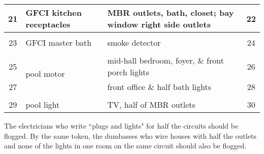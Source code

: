 \documentclass[10pt]{article}
\newcommand{\sep}{1mm}
\newcommand{\negsep}{-4mm}
\newcommand{\+}{\item}		%
\begin{document}
{\begin{minipage}[c]{3.36in}
\begin{tabular}{| c | p{1.19in} | p{1.19in} | c | }
21 & GFCI kitchen receptacles & MBR outlets, bath, closet; bay window right side outlets & 22 \\[\sep]
\hline\\[\negsep]

23 & GFCI master bath & smoke detector & 24 \\[\sep]
\hline\\[\negsep]

25 & \multirow{2}{1.15in}{\centering pool motor} & mid-hall bedroom, foyer, \& front porch lights & 26 \\[\sep]
\cline{3-4}
27 &  & front office \& half bath lights & 28 \\[\sep]
\hline\\[\negsep]

29 & \centering pool light & TV, half of MBR outlets & 30 \\[\sep]
\hline

\end{tabular}
\smallskip

\begin{footnotesize}
The electricians who write ``plugs and lights" for half the circuits should be flogged.
By the same token, the dumbasses who wire houses with half the outlets and none of the lights in one room on the same circuit should also be flogged.
\end{footnotesize}

\end{minipage}
}
\end{document}
